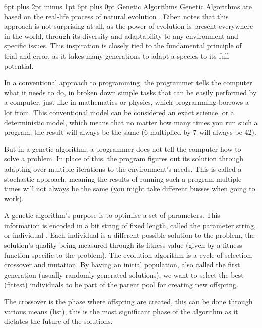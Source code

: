 \documentclass[12pt,a4paper]{article}
\makeatletter
\renewcommand\subsection{\@startsection {subsection}{1}{2mm} %
                               {6pt plus 2pt minus 1pt} %
                               {6pt plus 0pt} %
                               {\normalfont\bfseries}}
\makeatother
\begin{document}
	\subsection{Genetic Algorithms}
Genetic Algorithms are based on the real-life process of natural evolution \cite{agoston_e._eiben_introduction_2015}. Eiben notes that this approach is not surprising at all, as the power of evolution is present everywhere in the world, through its diversity and adaptability to any environment and specific issues. This inspiration is closely tied to the fundamental principle of trial-and-error, as it takes many generations to adapt a species to its full potential.\par
In a conventional approach to programming, the programmer tells the computer what it needs to do, in broken down simple tasks that can be easily performed by a computer, just like in mathematics or physics, which programming borrows a lot from. This conventional model can be considered an exact science, or a deterministic model, which means that no matter how many times you run such a program, the result will always be the same (6 multiplied by 7 will always be 42).\par
But in a genetic algorithm, a programmer does not tell the computer how to solve a problem. In place of this, the program figures out its solution through adapting over multiple iterations to the environment’s needs. This is called a stochastic approach, meaning the results of running such a program multiple times will not always be the same (you might take different busses when going to work).\par
A genetic algorithm’s purpose is to optimise a set of parameters. This information is encoded in a bit string of fixed length, called the parameter string, or individual \cite{goldberg_genetic_1988}. Each individual is a different possible solution to the problem, the solution’s quality being measured through its fitness value (given by a fitness function specific to the problem). The evolution algorithm is a cycle of selection, crossover and mutation. By having an initial population, also called the first generation (usually randomly generated solutions), we want to select the best (fittest) individuals to be part of the parent pool for creating new offspring.\par
The crossover is the phase where offspring are created, this can be done through various means (list), this is the most significant phase of the algorithm as it dictates the future of the solutions.\par
\end{document}
